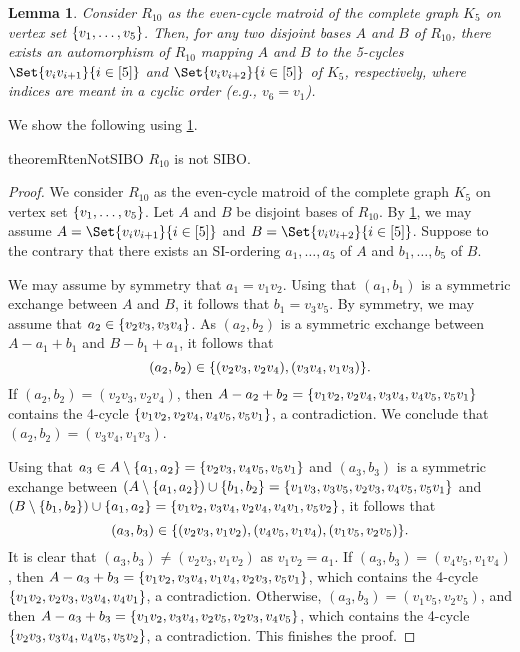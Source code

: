 \documentclass{article}
\DeclarePairedDelimiter{\set}{\{}{\}}
\newtheorem{lemma}[theorem]{Lemma}
\theoremstyle{definition}
\begin{document}
\begin{lemma} \label{lem:r10auto}
	Consider $R_{10}$ as the even-cycle matroid of the complete graph $K_5$ on vertex set $\set{v_1,\dots, v_5}$.
	Then, for any two disjoint bases $A$ and $B$ of $R_{10}$, there exists an automorphism of $R_{10}$ mapping $A$ and $B$ to the 5-cycles $\Set{v_iv_{i+1}}{i \in [5]}$ and  $\Set{v_iv_{i+2}}{i \in [5]}$ of $K_5$, respectively, where indices are meant in a cyclic order (e.g., $v_6 = v_1$).
\end{lemma}

We show the following using \cref{lem:r10auto}.

\begin{restatable}{theorem}{RtenNotSIBO}\label{thm:R10notSIBO}
    $R_{10}$ is not SIBO.
\end{restatable}

\begin{proof}
We consider $R_{10}$ as the even-cycle matroid of the complete graph $K_5$ on vertex set $\set{v_1,\dots, v_5}$. 
    Let $A$ and $B$ be disjoint bases of $R_{10}$. By \cref{lem:r10auto}, we may assume $A=\Set{v_iv_{i+1}}{i \in [5]}$ and  $B=\Set{v_iv_{i+2}}{i \in [5]}$.
    Suppose to the contrary that there exists an SI-ordering $a_1,\dotsc, a_5$ of $A$ and $b_1,\dotsc, b_5$ of $B$.
    
	We may assume by symmetry that $a_1 = v_1v_2$. Using that $(a_1,b_1)$ is a symmetric exchange between $A$ and $B$, it follows that $b_1 = v_3v_5$.
	By symmetry, we may assume that $a_2 \in \set{v_2v_3, v_3v_4}$. As $(a_2,b_2)$ is a symmetric exchange between $A-a_1+b_1$ and $B-b_1+a_1$, it follows that \[(a_2,b_2)\in \set{(v_2v_3, v_2v_4), (v_3v_4, v_1v_3)}.\] If $(a_2, b_2) = (v_2v_3, v_2v_4)$, then $A-a_2 + b_2 = \set{v_1v_2, v_2v_4, v_3v_4, v_4v_5, v_5v_1}$ contains the 4-cycle $\set{v_1v_2, v_2v_4, v_4v_5, v_5v_1}$, a contradiction. We conclude that $(a_2, b_2) = (v_3v_4, v_1v_3)$.
 
	Using that $a_3 \in A\setminus \set{a_1,a_2} = \set{v_2v_3, v_4v_5, v_5v_1}$ and 	
	$(a_3, b_3)$ is a symmetric exchange between $(A\setminus \set{a_1,a_2})\cup \set{b_1,b_2} = \set{v_1v_3, v_3v_5, v_2v_3, v_4v_5, v_5v_1}$ and $(B\setminus \set{b_1,b_2})\cup \set{a_1,a_2} = \set{v_1v_2, v_3v_4,  v_2v_4, v_4v_1, v_5v_2}$, it follows that \[(a_3, b_3) \in \set{(v_2v_3, v_1v_2), (v_4v_5, v_1v_4), (v_1v_5, v_2v_5)}.\]
	It is clear that $(a_3, b_3) \ne (v_2v_3, v_1v_2)$ as $v_1v_2 = a_1$.
	If $(a_3,b_3) = (v_4v_5, v_1v_4)$, then $A-a_3+b_3 = \set{v_1v_2, v_3v_4, v_1v_4, v_2v_3, v_5v_1}$, which contains the 4-cycle $\set{v_1v_2, v_2v_3, v_3v_4, v_4v_1}$, a contradiction.
	Otherwise, $(a_3, b_3) = (v_1v_5, v_2v_5)$, and then $A-a_3+b_3 = \set{v_1v_2, v_3v_4, v_2v_5, v_2v_3, v_4v_5}$, which contains the 4-cycle $\set{v_2v_3, v_3v_4, v_4v_5, v_5v_2}$, a contradiction.
	This finishes the proof.
\end{proof}
\end{document}
